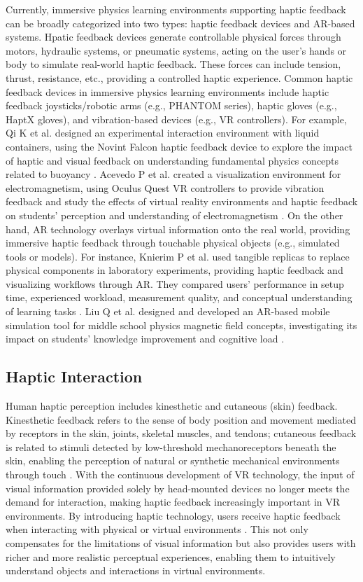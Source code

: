 \documentclass[runningheads]{llncs}
\begin{document}
Currently, immersive physics learning environments supporting haptic feedback can be broadly categorized into two types: haptic feedback devices and AR-based systems. Hpatic feedback devices generate controllable physical forces through motors, hydraulic systems, or pneumatic systems, acting on the user's hands or body to simulate real-world haptic feedback. These forces can include tension, thrust, resistance, etc., providing a controlled haptic experience. Common haptic feedback devices in immersive physics learning environments include haptic feedback joysticks/robotic arms (e.g., PHANTOM series), haptic gloves (e.g., HaptX gloves), and vibration-based devices (e.g., VR controllers). For example, Qi K et al. designed an experimental interaction environment with liquid containers, using the Novint Falcon haptic feedback device to explore the impact of haptic and visual feedback on understanding fundamental physics concepts related to buoyancy \cite{qi2020impact}. Acevedo P et al. created a visualization environment for electromagnetism, using Oculus Quest VR controllers to provide vibration feedback and study the effects of virtual reality environments and haptic feedback on students' perception and understanding of electromagnetism \cite{acevedo2022effects}. On the other hand, AR technology overlays virtual information onto the real world, providing immersive haptic feedback through touchable physical objects (e.g., simulated tools or models). For instance, Knierim P et al. used tangible replicas to replace physical components in laboratory experiments, providing haptic feedback and visualizing workflows through AR. They compared users' performance in setup time, experienced workload, measurement quality, and conceptual understanding of learning tasks \cite{knierim2020tangibility}. Liu Q et al. designed and developed an AR-based mobile simulation tool for middle school physics magnetic field concepts, investigating its impact on students' knowledge improvement and cognitive load \cite{liu2021effects}.

\subsection{Haptic Interaction}
Human haptic perception includes kinesthetic and cutaneous (skin) feedback. Kinesthetic feedback refers to the sense of body position and movement mediated by receptors in the skin, joints, skeletal muscles, and tendons; cutaneous feedback is related to stimuli detected by low-threshold mechanoreceptors beneath the skin, enabling the perception of natural or synthetic mechanical environments through touch \cite{hayward2004haptic}. With the continuous development of VR technology, the input of visual information provided solely by head-mounted devices no longer meets the demand for interaction, making haptic feedback increasingly important in VR environments. By introducing haptic technology, users receive haptic feedback when interacting with physical or virtual environments \cite{sreelakshmi2017haptic}. This not only compensates for the limitations of visual information but also provides users with richer and more realistic perceptual experiences, enabling them to intuitively understand objects and interactions in virtual environments.
\end{document}
